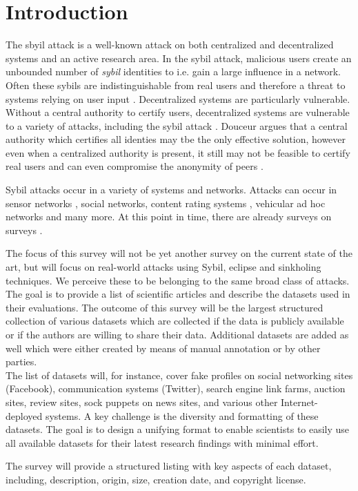 \section{Introduction}
	\label{sct:introduction}
	The sbyil attack is a well-known attack on both centralized and decentralized systems and an active research area.
	In the sybil attack, malicious users create an unbounded number of \emph{sybil} identities to i.e. gain a large influence in a network.
	Often these sybils are indistinguishable from real users and therefore a threat to systems relying on user input \cite{douceur2002sybil}.
	Decentralized systems are particularly vulnerable.
	Without a central authority to certify users, decentralized systems are vulnerable to a variety of attacks, including the sybil attack \cite{jetter2010quantitative}.
	Douceur \cite{douceur2002sybil} argues that a central authority which certifies all identies may tbe the only effective solution, however even when a centralized authority is present, it still may not be feasible to certify real users and can even compromise the anonymity of peers \cite{margolin2005quantifying, dewan2005securing}.
	
	Sybil attacks occur in a variety of systems and networks. 
	Attacks can occur in sensor networks , social networks, content rating systems \cite{kakhki11mitigating}, vehicular ad hoc networks \cite{park2009defense} and many more.
	At this point in time, there are already surveys on surveys \cite{koll2014state, mohaisen2013sybil, viswanath2011analysis}.
	
	The focus of this survey will not be yet another survey on the current state of the art, but will focus on real-world attacks using Sybil, eclipse and sinkholing techniques. 
	We perceive these to be belonging to the same broad class of attacks. 
	The goal is to provide a list of scientific articles and describe the datasets used in their evaluations.
	The outcome of this survey will be the largest structured collection of various datasets which are collected if the data is publicly available or if the authors are willing to share their data. Additional datasets are added as well which were either created by means of manual annotation or by other parties.\\
	The list of datasets will, for instance, cover fake profiles on social networking sites (Facebook), communication systems (Twitter), search engine link farms, auction sites, review sites, sock puppets on news sites, and various other Internet-deployed systems. 
	A key challenge is the diversity and formatting of these datasets. 
	The goal is to design a unifying format to enable scientists to easily use all available datasets for their latest research findings with minimal effort.
	
	The survey will provide a structured listing with key aspects of each dataset, including, description, origin, size, creation date, and copyright license.